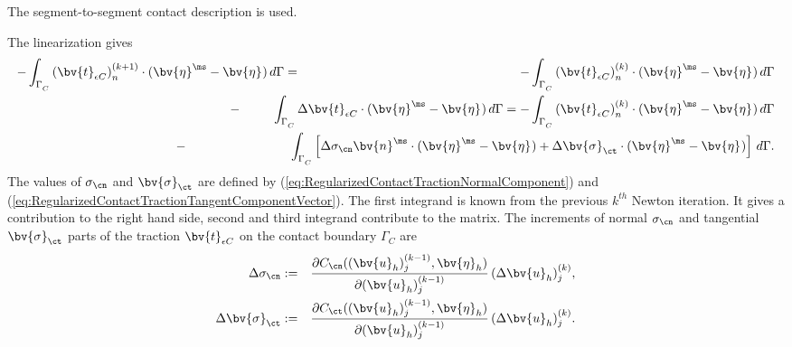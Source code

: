 The segment-to-segment contact description is used.

The linearization gives
\begin{eqnarray}
-\int_{\Gamma^{\sl}_C} \left(\bv{t}_{\epsilon C}\right)^{(k+1)}_n \cdot (\bv{\eta}^{\ms} - \bv{\eta}^{\sl}) \, d\Gamma &=& -\int_{\Gamma^{\sl}_C} \left(\bv{t}_{\epsilon C}\right)^{(k)}_n \cdot (\bv{\eta}^{\ms} - \bv{\eta}^{\sl}) \, d\Gamma\nonumber \\
 &\hspace{-1.5cm}-&\hspace{-1cm} \int_{\Gamma^{\sl}_C} \Delta \bv{t}_{\epsilon C} \cdot (\bv{\eta}^{\ms} - \bv{\eta}^{\sl}) \, d\Gamma = -\int_{\Gamma^{\sl}_C} \left(\bv{t}_{\epsilon C}\right)^{(k)}_n \cdot (\bv{\eta}^{\ms} - \bv{\eta}^{\sl}) \, d\Gamma\nonumber \\ 
 &\hspace{-3cm}-&\hspace{-2cm} \int_{\Gamma^{\sl}_C}   \left[ \Delta \sigma_{\cn} \bv{n}^{\ms} \cdot (\bv{\eta}^{\ms} - \bv{\eta}^{\sl})
+ \Delta \bv{\sigma}_{\ct} \cdot (\bv{\eta}^{\ms} - \bv{\eta}^{\sl}) \right]  \, d\Gamma.  \label{ContTermLin}
\end{eqnarray}
The values of $\sigma_{\cn}$ and $\bv{\sigma}_{\ct}$ are defined by (\ref{eq:RegularizedContactTractionNormalComponent}) and (\ref{eq:RegularizedContactTractionTangentComponentVector}). The first integrand is known from the previous $k^{th}$ Newton iteration. It gives a contribution to the right hand side, second and third integrand contribute to the matrix. The increments of normal $\sigma_{\cn}$ and tangential $\bv{\sigma}_{\ct}$ parts of the traction $\bv{t}_{\epsilon C}$ on the contact boundary $\Gamma_C$ are
\begin{eqnarray}
\Delta \sigma_{\cn}&:=&\frac{\partial
  C_{\cn}((\bv{u}_h)_j^{(k-1)},\bv{\eta} _h)}{\partial
  (\bv{u}_h)_j^{(k-1)}} \, (\Delta\bv{u}_h)_j^{(k)}, \nonumber \\
\Delta \bv{\sigma}_{\ct}&:=&\frac{\partial
  C_{\ct}((\bv{u}_h)_j^{(k-1)},\bv{\eta} _h)}{\partial
  (\bv{u}_h)_j^{(k-1)}} \, (\Delta\bv{u}_h)_j^{(k)}. \nonumber
\end{eqnarray}


